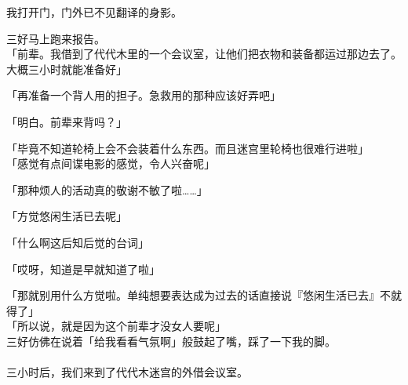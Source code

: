 我打开门，门外已不见翻译的身影。

三好马上跑来报告。\\

「前辈。我借到了代代木里的一个会议室，让他们把衣物和装备都运过那边去了。大概三小时就能准备好」

「再准备一个背人用的担子。急救用的那种应该好弄吧」

「明白。前辈来背吗？」

「毕竟不知道轮椅上会不会装着什么东西。而且迷宫里轮椅也很难行进啦」\\

「感觉有点间谍电影的感觉，令人兴奋呢」

「那种烦人的活动真的敬谢不敏了啦……」

「方觉悠闲生活已去呢」

「什么啊这后知后觉的台词」

「哎呀，知道是早就知道了啦」

「那就别用什么方觉啦。单纯想要表达成为过去的话直接说『悠闲生活已去』不就得了」\\

「所以说，就是因为这个前辈才没女人要呢」\\

三好仿佛在说着「给我看看气氛啊」般鼓起了嘴，踩了一下我的脚。\\

\sqsplit\\

三小时后，我们来到了代代木迷宫的外借会议室。\\

